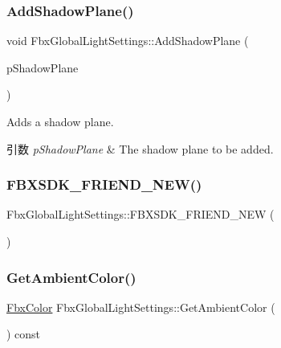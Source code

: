\subsubsection{\texorpdfstring{Add\+Shadow\+Plane()}{AddShadowPlane()}}
{\footnotesize\ttfamily void Fbx\+Global\+Light\+Settings\+::\+Add\+Shadow\+Plane (\begin{DoxyParamCaption}\item[{\hyperlink{struct_fbx_global_light_settings_1_1_shadow_plane}{Shadow\+Plane}}]{p\+Shadow\+Plane }\end{DoxyParamCaption})}

Adds a shadow plane. 
\begin{DoxyParams}{引数}
{\em p\+Shadow\+Plane} & The shadow plane to be added. \\
\hline
\end{DoxyParams}
\mbox{\label{class_fbx_global_light_settings_a75e0ecfb557240691dbaf02364c7d536}} 
\subsubsection{\texorpdfstring{F\+B\+X\+S\+D\+K\+\_\+\+F\+R\+I\+E\+N\+D\+\_\+\+N\+E\+W()}{FBXSDK\_FRIEND\_NEW()}}
{\footnotesize\ttfamily Fbx\+Global\+Light\+Settings\+::\+F\+B\+X\+S\+D\+K\+\_\+\+F\+R\+I\+E\+N\+D\+\_\+\+N\+EW (\begin{DoxyParamCaption}{ }\end{DoxyParamCaption})}

\mbox{\label{class_fbx_global_light_settings_aa57a507a5e0058d481c8a58ba04f11e2}} 
\subsubsection{\texorpdfstring{Get\+Ambient\+Color()}{GetAmbientColor()}}
{\footnotesize\ttfamily \hyperlink{class_fbx_color}{Fbx\+Color} Fbx\+Global\+Light\+Settings\+::\+Get\+Ambient\+Color (\begin{DoxyParamCaption}{ }\end{DoxyParamCaption}) const}


